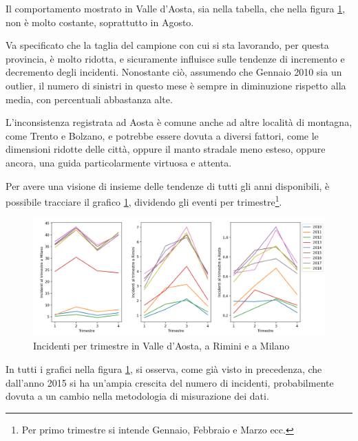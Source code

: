 \documentclass[a4paper,12pt]{report}
\begin{document}
Il comportamento mostrato in Valle d'Aosta, sia nella tabella, 
che nella figura \ref{fig:aosta-rimini-milano-trimestre}, non è molto costante, 
soprattutto in Agosto. 

Va specificato che la taglia del campione con cui si sta lavorando, per questa provincia, 
è molto ridotta, e sicuramente influisce sulle tendenze di incremento e decremento 
degli incidenti. 
Nonostante ciò, assumendo che Gennaio 2010 sia un outlier, il numero di sinistri in 
questo mese è sempre in diminuzione rispetto alla media, con percentuali abbastanza alte. 

L'inconsistenza registrata ad Aosta è comune anche ad altre località di montagna, come Trento e 
Bolzano, e potrebbe essere dovuta a diversi fattori, come 
le dimensioni ridotte delle città, oppure il manto stradale meno esteso, oppure ancora, 
una guida particolarmente virtuosa e attenta.

Per avere una visione di insieme delle tendenze di tutti gli anni disponibili, 
è possibile tracciare 
il grafico \ref{fig:aosta-rimini-milano-trimestre}, dividendo gli eventi 
per trimestre\footnote{Per primo trimestre si intende Gennaio, Febbraio e Marzo ecc.}. 

\begin{figure}
    \includegraphics[width=\linewidth]{../src/incidenti/incidenti_senza_coords/mese_incidenti/trimestri_aosta_milano_rimini.png}
    \caption{Incidenti per trimestre in Valle d'Aosta, a Rimini e a Milano}
    \label{fig:aosta-rimini-milano-trimestre}
\end{figure}

In tutti i grafici nella figura \ref{fig:aosta-rimini-milano-trimestre}, 
si osserva, come già visto in precedenza, che dall'anno 2015 si ha un'ampia crescita  
del numero di incidenti, probabilmente dovuta a un cambio 
nella metodologia di misurazione dei dati. 
\end{document}
